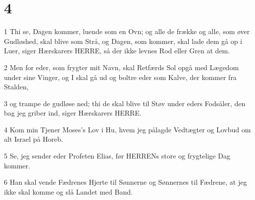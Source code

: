 \chapter{4}

\par 1 Thi se, Dagen kommer, luende som en Ovn; og alle de frække og alle, som øver Gudløshed, skal blive som Strå, og Dagen, som kommer, skal lade dem gå op i Luer, siger Hærskarers HERRE, så der ikke levnes Rod eller Gren at dem.
\par 2 Men for eder, som frygter mit Navn, skal Retfærds Sol opgå med Lægedom under sine Vinger, og I skal gå ud og boltre eder som Kalve, der kommer fra Stalden,
\par 3 og trampe de gudløse ned; thi de skal blive til Støv under eders Fodsåler, den bag jeg griber ind, siger Hærskarers HERRE.
\par 4 Kom min Tjener Moses's Lov i Hu, hvem jeg pålagde Vedtægter og Lovbud om alt Israel på Horeb.
\par 5 Se, jeg sender eder Profeten Elias, før HERRENs store og frygtelige Dag kommer.
\par 6 Han skal vende Fædrenes Hjerte til Sønnerne og Sønnernes til Fædrene, at jeg ikke skal komme og slå Landet med Band.


